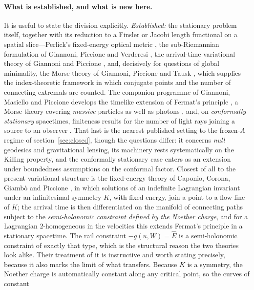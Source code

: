 \documentclass[12pt]{iopart}
\theoremstyle{plain}
\theoremstyle{definition}
\theoremstyle{remark}
\newcommand{\Ehat}{\hat E}
\begin{document}
\paragraph{What is established, and what is new here.} It is useful to state the division
explicitly. \emph{Established:} the stationary problem itself, together with its reduction
to a Finsler or Jacobi length functional on a spatial slice---Perlick's fixed-energy
optical metric \cite{Perlick1991}, the sub-Riemannian formulation of Giannoni, Piccione and
Verderesi \cite{GiannoniPiccioneVerderesi1997}, the arrival-time variational theory of
Giannoni and Piccione \cite{GiannoniPiccione2002}, and, decisively for questions of global
minimality, the Morse theory of Giannoni, Piccione and Tausk
\cite{GiannoniPiccioneTausk2002}, which supplies the index-theoretic framework in which
conjugate points and the number of connecting extremals are counted. The companion
programme of Giannoni, Masiello and Piccione develops the timelike extension of Fermat's
principle \cite{GiannoniMasielloPiccione1998}, a Morse theory covering \emph{massive}
particles as well as photons \cite{GiannoniMasielloPiccione2000}, and, on
\emph{conformally stationary} spacetimes, finiteness results for the number of
light rays joining a source to an observer \cite{GiannoniMasielloPiccione2001}.
That last is the nearest published setting to the frozen-$A$ regime of
section~\ref{sec:closed}, though the questions differ: it concerns \emph{null}
geodesics and gravitational lensing, its machinery rests systematically on the
Killing property, and the conformally stationary case enters as an extension
under boundedness assumptions on the conformal factor. Closest of
all to the present variational structure is the fixed-energy theory of Caponio, Corona,
Giamb\`o and Piccione \cite{CaponioCoronaGiamboPiccione2024}, in which solutions of an
indefinite Lagrangian invariant under an infinitesimal symmetry $K$, with fixed energy,
join a point to a flow line of $K$; the arrival time is then differentiated on the
manifold of connecting paths subject to the \emph{semi-holonomic constraint defined by
the Noether charge}, and for a Lagrangian $2$-homogeneous in the velocities this extends
Fermat's principle in a stationary spacetime. The rail constraint $-g(u,W)=\Ehat$ is a
semi-holonomic constraint of exactly that type, which is the structural reason the two
theories look alike. Their treatment of it is instructive and worth stating precisely,
because it also marks the limit of what transfers. Because $K$ is a symmetry, the Noether
charge is automatically constant along any critical point, so the curves of constant
\end{document}
